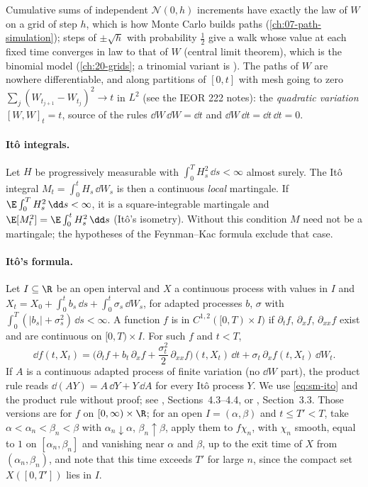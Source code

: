 Cumulative sums of independent $\mathcal N(0,h)$ increments have exactly the law of $W$ on a
grid of step $h$, which is how Monte Carlo builds paths (\cref{ch:07-path-simulation}); steps of
$\pm\sqrt h$ with probability $\frac12$ give a walk whose value at each fixed time converges in
law to that of $W$ (central limit theorem), which is the binomial model (\cref{ch:20-grids};
a trinomial variant is ). The paths of $W$ are nowhere differentiable, and
along partitions of $[0,t]$ with mesh going to zero $\sum_j(W_{t_{j+1}}-W_{t_j})^2\to t$ in $L^2$
(see the IEOR 222 notes): the \emph{quadratic variation} $[W,W]_t=t$, source of the
rules $\dd W\,\dd W=\dd t$ and $\dd W\,\dd t=\dd t\,\dd t=0$.

\paragraph{It\^o integrals.} Let $H$ be progressively measurable with
$\int_0^TH_s^2\,\dd s<\infty$ almost surely. The It\^o integral $M_t=\int_0^tH_s\,\dd W_s$ is
then a continuous \emph{local} martingale. If $\E\int_0^TH_s^2\,\dd s<\infty$, it is a
square-integrable martingale and $\E[M_t^2]=\E\int_0^tH_s^2\,\dd s$ (It\^o's isometry). Without
this condition $M$ need not be a martingale; the hypotheses of the Feynman--Kac formula exclude
that case.

\paragraph{It\^o's formula.} Let $I\subseteq\R$ be an open interval and $X$ a continuous process
with values in $I$ and $X_t=X_0+\int_0^tb_s\,\dd s+\int_0^t\sigma_s\,\dd W_s$, for adapted
processes $b$, $\sigma$ with $\int_0^T(|b_s|+\sigma_s^2)\,\dd s<\infty$. A function $f$ is in
$C^{1,2}([0,T)\times I)$ if $\partial_tf$, $\partial_xf$, $\partial_{xx}f$ exist and are continuous
on $[0,T)\times I$. For such $f$ and $t<T$,
\begin{equation}\label{eq:sm-ito}
  \dd f(t,X_t)=\Big(\partial_tf+b_t\,\partial_xf+\frac{\sigma_t^2}{2}\,\partial_{xx}f\Big)(t,X_t)\,\dd t
  +\sigma_t\,\partial_xf(t,X_t)\,\dd W_t .
\end{equation}
If $A$ is a continuous adapted process of finite variation (no $\dd W$ part), the product rule
reads $\dd(AY)=A\,\dd Y+Y\,\dd A$ for every It\^o process $Y$. We use \eqref{eq:sm-ito} and the
product rule without proof; see \textcite{shreve2}, Sections~4.3--4.4, or
\textcite{karatzas-shreve}, Section~3.3. Those versions are for $f$ on $[0,\infty)\times\R$; for an
open $I=(\alpha,\beta)$ and $t\le T'<T$, take $\alpha<\alpha_n<\beta_n<\beta$ with
$\alpha_n\downarrow\alpha$, $\beta_n\uparrow\beta$, apply them to $f\chi_n$, with $\chi_n$ smooth, equal
to $1$ on $[\alpha_n,\beta_n]$ and vanishing near $\alpha$ and $\beta$, up to the exit time of $X$
from $(\alpha_n,\beta_n)$, and note that this time exceeds $T'$ for large $n$, since the compact
set $X([0,T'])$ lies in $I$.

